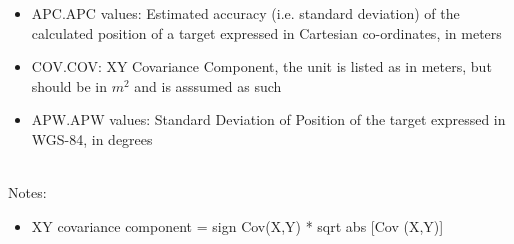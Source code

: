 \begin{itemize}
\item APC.APC values: Estimated accuracy (i.e. standard deviation) of the calculated position of a target expressed in Cartesian co-ordinates, in meters
\item COV.COV: XY Covariance Component, the unit is listed as in meters, but should be in $m^2$ and is asssumed as such
\item APW.APW values: Standard Deviation of Position of the target expressed in WGS-84, in degrees
\end{itemize}
\ \\

Notes:
\begin{itemize}
\item XY covariance component = sign {Cov(X,Y)} * sqrt {abs [Cov (X,Y)]}
\end{itemize}
